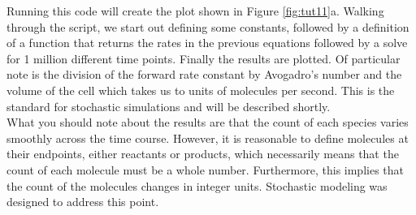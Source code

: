 

Running this code will create the plot shown in Figure \ref{fig:tut11}a.  Walking through the script, we start out defining some constants, followed by a definition of a function that returns the rates in the previous equations followed by a solve for 1 million different time points.  Finally the results are plotted.  Of particular note is the division of the forward rate constant by Avogadro's number and the volume of the cell which takes us to units of molecules per second.  This is the standard for stochastic simulations and will be described shortly.\\

What you should note about the results are that the count of each species varies smoothly across the time course.  However, it is reasonable to define molecules at their endpoints, either reactants or products, which necessarily means that the count of each molecule must be a whole number.  Furthermore, this implies that the count of the molecules changes in integer units.  Stochastic modeling was designed to address this point.  \\

